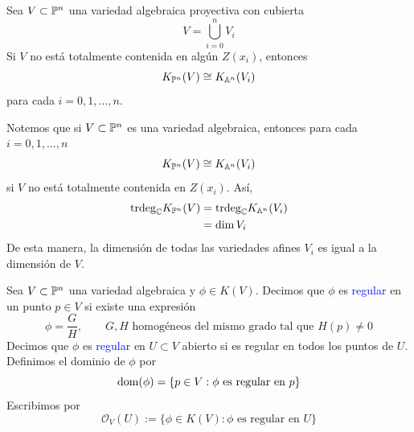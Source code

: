     \begin{lemma}
        Sea $V\subset\mathbb{P}^n$ una variedad algebraica proyectiva con cubierta
        \begin{equation*}
            V=\bigcup_{i=0}^n V_i
        \end{equation*}
        Si $V$ no está totalmente contenida en algún $Z(x_i)$, entonces
        \begin{equation*}
            K_{\mathbb{P}^n}(V)\cong K_{\mathbb{A}^n}(V_i)
        \end{equation*}
        para cada $i=0,1,\dots, n$.
    \end{lemma}

    \begin{remark}
        Notemos que si $V\subset\mathbb{P}^n$ es una variedad algebraica, entonces para cada $i=0,1,\dots, n$
        \begin{equation*}
             K_{\mathbb{P}^n}(V)\cong K_{\mathbb{A}^n}(V_i)
        \end{equation*}
        si $V$ no está totalmente contenida en $Z(x_i)$. Así,
        \begin{align*}
            \mathrm{trdeg}_{\mathbb{C}} K_{\mathbb{P}^n}(V)&=\mathrm{trdeg}_{\mathbb{C}} K_{\mathbb{A}^n}(V_i)\\
            &=\dim V_i
        \end{align*}
        De esta manera, la dimensión de todas las variedades afines $V_i$ es igual a la dimensión de $V$.
    \end{remark}

    \begin{definition}
        Sea $V\subset\mathbb{P}^n$ una variedad algebraica y $\phi\in K(V)$. Decimos que $\phi$ es \textcolor{blue}{regular} en un punto $p\in V$ si existe una expresión 
        \begin{equation*}
            \phi=\frac{G}{H},\qquad G,H\text{ homogéneos del mismo grado tal que }H(p)\neq 0
        \end{equation*}
        Decimos que $\phi$ es \textcolor{blue}{regular} en $U\subset V$ abierto si es regular en todos los puntos de $U$.
        Definimos el dominio de $\phi$ por
        \begin{equation*}
            \mathrm{dom}(\phi)=\{p\in V:\phi\text{ es regular en }p\}
        \end{equation*}
        Escribimos por
        \begin{equation*}
            \mathcal{O}_V(U):=\{\phi\in K(V): \phi\text{ es regular en }U\}
        \end{equation*}
    \end{definition}

